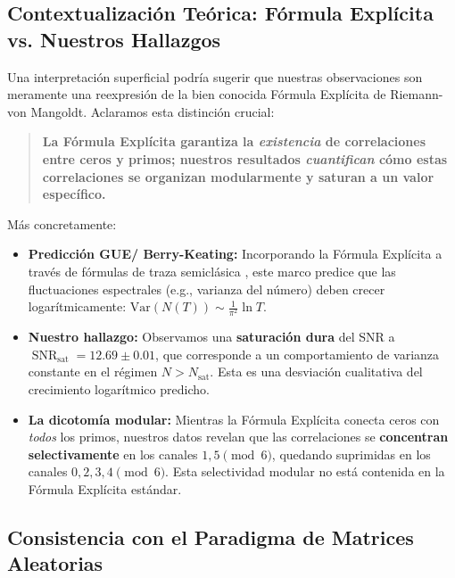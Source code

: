 \documentclass[12pt, a4paper]{article}
\theoremstyle{plain}
\theoremstyle{definition}
\theoremstyle{remark}
\newcommand{\SNR}{\operatorname{SNR}}
\begin{document}
\subsection{Contextualización Teórica: Fórmula Explícita vs. Nuestros Hallazgos}
\label{subsec:contexto_teorico}

Una interpretación superficial podría sugerir que nuestras observaciones son meramente una reexpresión de la bien conocida Fórmula Explícita de Riemann-von Mangoldt. Aclaramos esta distinción crucial:

\begin{quote}
\textbf{La Fórmula Explícita garantiza la \textit{existencia} de correlaciones entre ceros y primos; nuestros resultados \textit{cuantifican} cómo estas correlaciones se organizan modularmente y saturan a un valor específico.}
\end{quote}

Más concretamente:

\begin{itemize}
    \item \textbf{Predicción GUE/ Berry-Keating:} Incorporando la Fórmula Explícita a través de fórmulas de traza semiclásica \cite{berry1985}, este marco predice que las fluctuaciones espectrales (e.g., varianza del número) deben crecer logarítmicamente: $\text{Var}(N(T)) \sim \frac{1}{\pi^2}\ln T$.
    
    \item \textbf{Nuestro hallazgo:} Observamos una \textbf{saturación dura} del SNR a $\SNR_{\text{sat}} = 12.69 \pm 0.01$, que corresponde a un comportamiento de varianza constante en el régimen $N > N_{\text{sat}}$. Esta es una desviación cualitativa del crecimiento logarítmico predicho.
    
    \item \textbf{La dicotomía modular:} Mientras la Fórmula Explícita conecta ceros con \textit{todos} los primos, nuestros datos revelan que las correlaciones se \textbf{concentran selectivamente} en los canales $1,5 \pmod{6}$, quedando suprimidas en los canales $0,2,3,4 \pmod{6}$. Esta selectividad modular no está contenida en la Fórmula Explícita estándar.
\end{itemize}

\subsection{Consistencia con el Paradigma de Matrices Aleatorias}
\label{subsec:consistencia_rmt}
\end{document}
